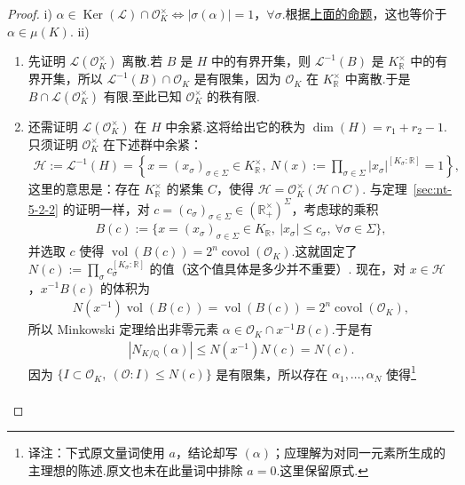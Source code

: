 \begin{proof}
\textup{i)} $\alpha\in\operatorname{Ker}(\mathcal L)\cap\mathcal O_K^\times\Longleftrightarrow|\sigma(\alpha)|=1$，$\forall\sigma$.根据\hyperref[prop:nt-5-3-2-modulus-one]{上面的命题}，这也等价于 $\alpha\in\mu(K)$.
\textup{ii)}
\begin{enumerate}[label=(\alph*)]
\item 先证明 $\mathcal L(\mathcal O_K^\times)$ 离散.若 $B$ 是 $H$ 中的有界开集，则 $\mathcal L^{-1}(B)$ 是 $K_{\mathbb R}^\times$ 中的有界开集，所以 $\mathcal L^{-1}(B)\cap\mathcal O_K$ 是有限集，因为 $\mathcal O_K$ 在 $K_{\mathbb R}^\times$ 中离散.于是 $B\cap\mathcal L(\mathcal O_K^\times)$ 有限.至此已知 $\mathcal O_K^\times$ 的秩有限.
\item 还需证明 $\mathcal L(\mathcal O_K^\times)$ 在 $H$ 中余紧.这将给出它的秩为 $\dim(H)=r_1+r_2-1$.只须证明 $\mathcal O_K^\times$ 在下述群中余紧：
\begin{align*}
\mathcal H:=\mathcal L^{-1}(H)
=\left\{x=(x_\sigma)_{\sigma\in\Sigma}\in K_{\mathbb R}^\times,\ N(x):=\prod_{\sigma\in\Sigma}|x_\sigma|^{[K_\sigma:\mathbb R]}=1\right\},
\end{align*}
这里的意思是：存在 $K_{\mathbb R}^\times$ 的紧集 $C$，使得 $\mathcal H=\mathcal O_K^\times(\mathcal H\cap C)$.
与定理~\ref{sec:nt-5-2-2} 的证明一样，对 $c=(c_\sigma)_{\sigma\in\Sigma}\in(\mathbb R_+^\times)^\Sigma$，考虑球的乘积
\begin{align*}
B(c):=\{x=(x_\sigma)_{\sigma\in\Sigma}\in K_{\mathbb R},\ |x_\sigma|\le c_\sigma,\ \forall\sigma\in\Sigma\},
\end{align*}
并选取 $c$ 使得 $\operatorname{vol}(B(c))=2^n\operatorname{covol}(\mathcal O_K)$.这就固定了 $N(c):=\prod_\sigma c_\sigma^{[K_\sigma:\mathbb R]}$ 的值（这个值具体是多少并不重要）.
现在，对 $x\in\mathcal H$，$x^{-1}B(c)$ 的体积为
\begin{align*}
N(x^{-1})\operatorname{vol}(B(c))=\operatorname{vol}(B(c))=2^n\operatorname{covol}(\mathcal O_K),
\end{align*}
所以 Minkowski 定理给出非零元素 $\alpha\in\mathcal O_K\cap x^{-1}B(c)$.于是有
\begin{align*}
|N_{K/\mathbb Q}(\alpha)|\le N(x^{-1})N(c)=N(c).
\end{align*}
因为 $\{I\subset\mathcal O_K,\ (\mathcal O:I)\le N(c)\}$ 是有限集，所以存在 $\alpha_1,\ldots,\alpha_N$ 使得\footnote{译注：下式原文量词使用 $a$，结论却写 $(\alpha)$；应理解为对同一元素所生成的主理想的陈述.原文也未在此量词中排除 $a=0$.这里保留原式.}
\begin{align*}

\end{align*}
\end{enumerate}
\end{proof}
